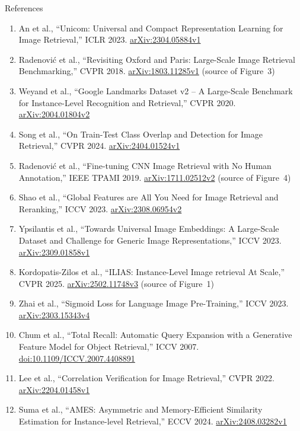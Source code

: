 \begin{frame}[allowframebreaks]{References}
\begin{enumerate}
    \item An et al., ``Unicom: Universal and Compact Representation Learning for Image Retrieval,'' ICLR 2023. \href{https://arxiv.org/abs/2304.05884v1}{arXiv:2304.05884v1}
    \item Radenovi\'c et al., ``Revisiting Oxford and Paris: Large-Scale Image Retrieval Benchmarking,'' CVPR 2018. \href{https://arxiv.org/abs/1803.11285v1}{arXiv:1803.11285v1} (source of Figure~3)
    \item Weyand et al., ``Google Landmarks Dataset v2 -- A Large-Scale Benchmark for Instance-Level Recognition and Retrieval,'' CVPR 2020. \href{https://arxiv.org/abs/2004.01804v2}{arXiv:2004.01804v2}
    \item Song et al., ``On Train-Test Class Overlap and Detection for Image Retrieval,'' CVPR 2024. \href{https://arxiv.org/abs/2404.01524v1}{arXiv:2404.01524v1}
    \item Radenovi\'c et al., ``Fine-tuning CNN Image Retrieval with No Human Annotation,'' IEEE TPAMI 2019. \href{https://arxiv.org/abs/1711.02512v2}{arXiv:1711.02512v2} (source of Figure~4)
    \item Shao et al., ``Global Features are All You Need for Image Retrieval and Reranking,'' ICCV 2023. \href{https://arxiv.org/abs/2308.06954v2}{arXiv:2308.06954v2}
    \item Ypsilantis et al., ``Towards Universal Image Embeddings: A Large-Scale Dataset and Challenge for Generic Image Representations,'' ICCV 2023. \href{https://arxiv.org/abs/2309.01858v1}{arXiv:2309.01858v1}
    \item Kordopatis-Zilos et al., ``ILIAS: Instance-Level Image retrieval At Scale,'' CVPR 2025. \href{https://arxiv.org/abs/2502.11748v3}{arXiv:2502.11748v3} (source of Figure~1)
    \item Zhai et al., ``Sigmoid Loss for Language Image Pre-Training,'' ICCV 2023. \href{https://arxiv.org/abs/2303.15343v4}{arXiv:2303.15343v4}
    \item Chum et al., ``Total Recall: Automatic Query Expansion with a Generative Feature Model for Object Retrieval,'' ICCV 2007. \href{https://doi.org/10.1109/ICCV.2007.4408891}{doi:10.1109/ICCV.2007.4408891}
    \item Lee et al., ``Correlation Verification for Image Retrieval,'' CVPR 2022. \href{https://arxiv.org/abs/2204.01458v1}{arXiv:2204.01458v1}
    \item Suma et al., ``AMES: Asymmetric and Memory-Efficient Similarity Estimation for Instance-level Retrieval,'' ECCV 2024. \href{https://arxiv.org/abs/2408.03282v1}{arXiv:2408.03282v1}

\end{enumerate}
\end{frame}
